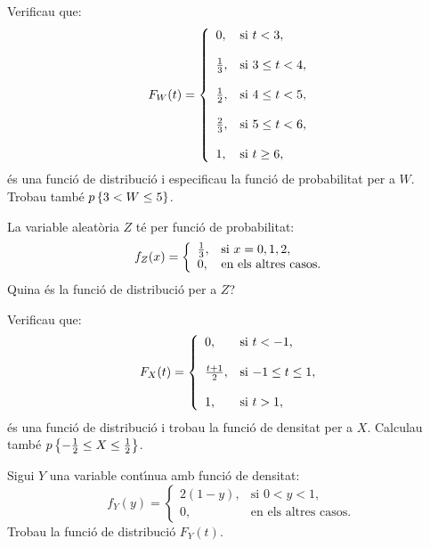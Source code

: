 \newpage

\begin{prob}
{Verificau que:
$$F_W (t)=
\left\{\begin{array}{ll}
0, & \text{si $t<3$},
\\ & \\ 
{1\over 3}, & \text{si $3\leq t<4$},
\\ & \\ 
{1\over 2}, & \text{si $4\leq t<5$},
\\ & \\ 
{2\over 3}, & \text{si $5\leq t<6$},
\\ & \\ 
1, & \text{si $t\geq 6$},
\end{array}\right.
$$
\'es una funci\'o de
distribuci\'o i especificau la funci\'o de probabilitat per a $W$. Trobau
tamb\'e $\pp{3<W\leq 5}$.}
\end{prob}

\begin{prob}
{La variable aleat\`oria $Z$ t\'e per funci\'o de probabilitat:
$$f_Z (x)=
\left\{\begin{array}{ll}
{1\over 3}, & \text{si $x=0,1,2$},\\ 0, & \text{en els altres
casos.}
\end{array}\right.
$$
Quina \'es la funci\'o de distribuci\'o per a $Z$?}
\end{prob}

\begin{prob}
{Verificau que:
$$F_X (t)=
\left\{\begin{array}{ll}
0, & \text{si $t<-1$},
\\ & \\ 
{t+1\over 2}, & \text{si $-1\leq
t\leq 1$},
\\ & \\ 
1, & \text{si $t> 1$},
\end{array}\right.
$$
\'es una funci\'o de distribuci\'o i trobau la
funci\'o de densitat per a $X$. Calculau tamb\'e $\pp{-{1\over 2}\leq X\leq
{1\over 2}}$.}
\end{prob}

\begin{prob}
{Sigui $Y$ una variable cont\'{\i}nua amb funci\'o de densitat:
$$f_Y(y)=
\left\{\begin{array}{ll}
2(1-y), & \text{si $0<y<1$},\\ 0, & \text{en els altres casos}.
\end{array}\right.
$$Trobau la
funci\'o de distribuci\'o $F_Y(t)$.}
\end{prob}

